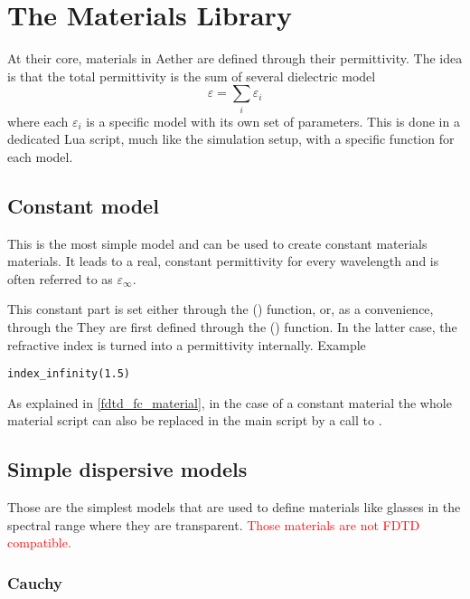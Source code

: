 \chapter{The Materials Library}
\label{matsection}

At their core, materials in Aether are defined through their permittivity. The idea is that the total permittivity is the sum of several dielectric model
\begin{equation}
	\varepsilon=\sum_i \varepsilon_i
\end{equation}
where each $\varepsilon_i$ is a specific model with its own set of parameters. This is done in a dedicated Lua script, much like the simulation setup, with a specific function for each model.

\section{Constant model}

This is the most simple model and can be used to create constant materials materials. It leads to a real, constant permittivity for every wavelength and is often referred to as $\varepsilon_\infty$.

This constant part is set either through the () function, or, as a convenience, through the They are first defined through the () function. In the latter case, the refractive index is turned into a permittivity internally. Example
\begin{lstlisting}
index_infinity(1.5)
\end{lstlisting}

As explained in \ref{fdtd_fc_material}, in the case of a constant material the whole material script can also be replaced in the main script by a call to .

\section{Simple dispersive models}

Those are the simplest models that are used to define materials like glasses in the spectral range where they are transparent. \textcolor{red}{Those materials are not FDTD compatible.}

\subsection{Cauchy}

